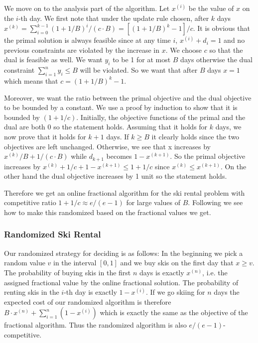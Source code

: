 We move on to the analysis part of the algorithm. Let $x^{(i)}$ be the value of $x$ on the $i$-th day. We first note that under the update rule chosen, after $k$ days $x^{(k)} =  \sum_{i=0}^{k-1} (1+1/B)^i / (c\cdot B) = [(1+1/B)^k-1]/c$. It is obvious that the primal solution is always feasible since at any time $i$, $x^{(i)}+d_i=1$ and no previous constraints are violated by the increase in $x$. We choose $c$ so that the dual is feasible as well. We want $y_i$ to be 1 for at most $B$ days otherwise the dual constraint  $\sum^n_{i=1} y_i \le B$ will be violated. So we want that after $B$ days $x = 1$ which means that $c = (1+1/B)^k-1$.

Moreover, we want the ratio between the primal objective and the dual objective to be bounded by a constant.
We use a proof by induction to show that it is bounded by $(1+1/c)$.
Initially, the objective functions of the primal and the dual are both 0 so the statement holds.
Assuming that it holds for $k$ days, we now prove that it holds for $k+1$ days.
If $k\ge B$ it clearly holds since the two objectives are left unchanged.
Otherwise, we see that x increases by $x^{(k)} / B + 1/(c \cdot B)$ while $d_{k+1}$ becomes $1 - x^{(k+1)}$.
So the primal objective increases by $x^{(k)} + 1/c + 1 - x^{(k+1)} \le 1 + 1/c$ since $x^{(k)} \le x^{(k+1)}$.
On the other hand the dual objective increases by 1 unit so the statement holds.

Therefore we get an online fractional algorithm for the ski rental problem with competitive ratio $1+1/c \approx e/(e-1)$ for large values of $B$.
Following we see how to make this randomized based on the fractional values we get.

\subsubsection{Randomized Ski Rental}
Our randomized strategy for deciding is as follows: In the beginning we pick a random value $v$ in the interval $[0,1]$ and we buy skis on the first day that $x \ge v$.
The probability of buying skis in the first $n$ days is exactly $x^{(n)}$, i.e. the assigned fractional value by the online fractional solution. The probability of renting skis in the $i$-th day is exactly $1-x^{(i)}$.
If we go skiing for $n$ days the expected cost of our randomized algorithm is therefore $B \cdot  x^{(n)} + \sum_{i=1}^n(1-x^{(i)})$ which is exactly the same as the objective of the fractional algorithm.
Thus the randomized algorithm is also $e/(e-1)$-competitive.

